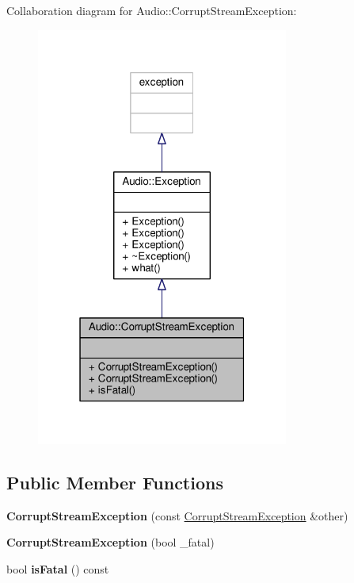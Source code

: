 Collaboration diagram for Audio\+:\+:Corrupt\+Stream\+Exception\+:
\nopagebreak
\begin{figure}[H]
\begin{center}
\leavevmode
\includegraphics[width=235pt]{dc/d3f/classAudio_1_1CorruptStreamException__coll__graph}
\end{center}
\end{figure}
\subsection*{Public Member Functions}
\begin{DoxyCompactItemize}
\item 
{\bfseries Corrupt\+Stream\+Exception} (const \hyperlink{classAudio_1_1CorruptStreamException}{Corrupt\+Stream\+Exception} \&other)\hypertarget{classAudio_1_1CorruptStreamException_adcc63f9d6b65e0814c0087eee73a5670}{}\label{classAudio_1_1CorruptStreamException_adcc63f9d6b65e0814c0087eee73a5670}

\item 
{\bfseries Corrupt\+Stream\+Exception} (bool \+\_\+fatal)\hypertarget{classAudio_1_1CorruptStreamException_a741478b32a7a39490346105e59a87ade}{}\label{classAudio_1_1CorruptStreamException_a741478b32a7a39490346105e59a87ade}

\item 
bool {\bfseries is\+Fatal} () const \hypertarget{classAudio_1_1CorruptStreamException_aeb76cc1fcb088fbfb2000cacea2679e3}{}\label{classAudio_1_1CorruptStreamException_aeb76cc1fcb088fbfb2000cacea2679e3}

\end{DoxyCompactItemize}


